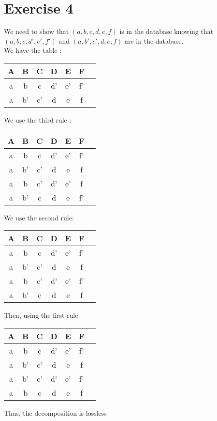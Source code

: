 \documentclass{cours}
\begin{document}
\section{Exercise 4}
We need to show that $(a, b, c, d, e, f)$ is in the database knowing that $(a, b, c, d', e', f')$ and $(a, b', c', d, e, f)$ are in the database. \\
We have the table : 
\begin{center}
	\begin{tabular}{ccccccc}
		\bf A & \bf B & \bf C & \bf D & \bf E & \bf F\\
		\midrule
		a & b & c & d' & e' & f'\\
		a & b' & c' & d & e & f
	\end{tabular}
\end{center}
We use the third rule : 
\begin{center}
	\begin{tabular}{ccccccc}
		\bf A & \bf B & \bf C & \bf D & \bf E & \bf F\\
		\midrule
		a & b & c & d' & e' & f'\\
		a & b' & c' & d & e & f\\
		a & b & c' & d' & e' & f\\
		a & b' & c & d & e & f'\\
	\end{tabular}
\end{center}
We use the second rule: 
\begin{center}
	\begin{tabular}{ccccccc}
		\bf A & \bf B & \bf C & \bf D & \bf E & \bf F\\
		\midrule
		a & b & c & d' & e' & f'\\
		a & b' & c' & d & e & f\\
		a & b & c' & d' & e' & f'\\
		a & b' & c & d & e & f\\
	\end{tabular}
\end{center}
Then, using the first rule: 
\begin{center}
	\begin{tabular}{ccccccc}
		\bf A & \bf B & \bf C & \bf D & \bf E & \bf F\\
		\midrule
		a & b & c & d' & e' & f'\\
		a & b' & c' & d & e & f\\
		a & b' & c' & d' & e' & f'\\
		a & b & c & d & e & f\\
	\end{tabular}
\end{center}
Thus, the decomposition is lossless
\end{document}
